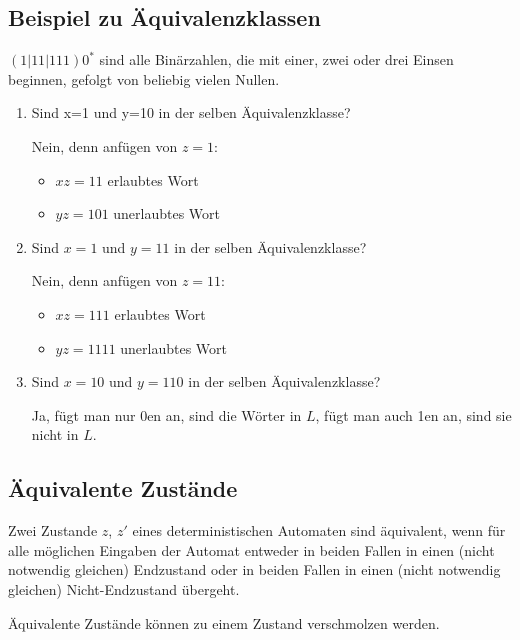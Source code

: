 \documentclass{lehramt-informatik-haupt}
\begin{document}
\subsection{Beispiel zu Äquivalenzklassen}

$(1|11|111)0^*$ sind alle Binärzahlen, die mit einer, zwei oder drei
Einsen beginnen, gefolgt von beliebig vielen Nullen.

\begin{enumerate}
\item Sind x=1 und y=10 in der selben Äquivalenzklasse?

Nein, denn anfügen von $z=1$:

\begin{itemize}
\item $xz = 11$ erlaubtes Wort

\item $yz = 101$ unerlaubtes Wort
\end{itemize}

\item Sind $x=1$ und $y=11$ in der selben Äquivalenzklasse?

Nein, denn anfügen von $z=11$:

\begin{itemize}
\item $xz = 111$ erlaubtes Wort
\item $yz = 1111$ unerlaubtes Wort
\end{itemize}

\item Sind $x=10$ und $y=110$ in der selben Äquivalenzklasse?

Ja, fügt man nur 0en an, sind die Wörter in $L$, fügt man auch 1en an,
sind sie nicht in $L$.
\end{enumerate}

\subsection{Äquivalente Zustände}

Zwei Zustande $z$, $z'$ eines deterministischen Automaten sind
äquivalent, wenn für alle möglichen Eingaben der Automat entweder in
beiden Fallen in einen (nicht notwendig gleichen) Endzustand oder in
beiden Fallen in einen (nicht notwendig gleichen) Nicht-Endzustand
übergeht.

Äquivalente Zustände können zu einem Zustand verschmolzen
werden.

\literatur
\end{document}

